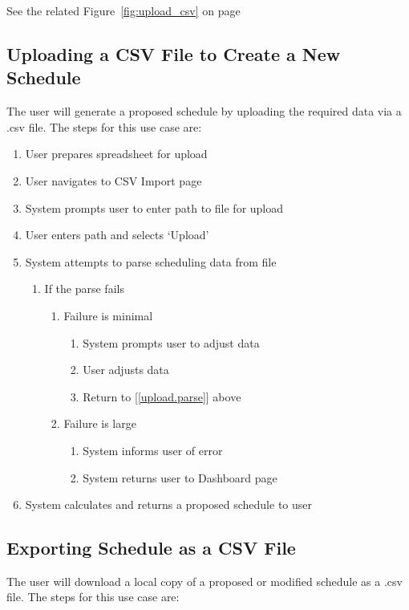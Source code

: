 \documentclass{extarticle}
\begin{document}
See the related Figure~\ref{fig:upload_csv} on page~\pageref{fig:upload_csv}

\subsection{Uploading a CSV File to Create a New Schedule}
The user will generate a proposed schedule by uploading the required data via a .csv file.  The steps for this use
case are:

\begin{enumerate}
\item User prepares spreadsheet for upload
\item User navigates to CSV Import page
\item System prompts user to enter path to file for upload
\item User enters path and selects `Upload'
\item \label{upload.parse} System attempts to parse scheduling data from file
  \begin{enumerate}
  \item If the parse fails
    \begin{enumerate}
    \item Failure is minimal
      \begin{enumerate}
        \item System prompts user to adjust data
        \item User adjusts data
        \item Return to [\ref{upload.parse}] above
      \end{enumerate}
    \item Failure is large
      \begin{enumerate}
        \item System informs user of error
        \item System returns user to Dashboard page
      \end{enumerate}
    \end{enumerate}
  \end{enumerate}
\item System calculates and returns a proposed schedule to user
\end{enumerate}

\subsection{Exporting Schedule as a CSV File}
The user will download a local copy of a proposed or modified schedule as a .csv file.  The steps for this use
case are:
\end{document}
